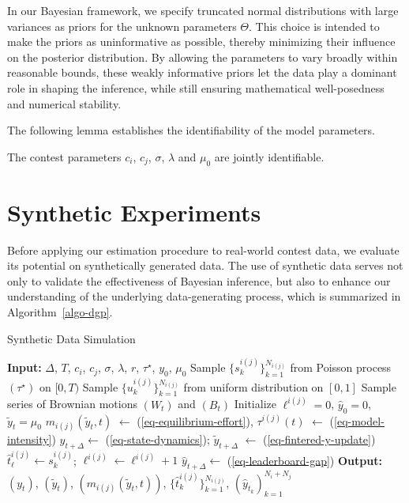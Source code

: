 \documentclass[mnsc]{informs3}
\begin{document}
In our Bayesian framework, we specify truncated normal distributions with large variances as priors for the unknown parameters $\Theta$.
This choice is intended to make the priors as uninformative as possible, thereby minimizing their influence on the posterior distribution. 
By allowing the parameters to vary broadly within reasonable bounds, these weakly informative priors let the data play a dominant role in shaping the inference, while still ensuring mathematical well-posedness and numerical stability.


The following lemma establishes the identifiability of the model parameters.

\begin{lemma}\label{lmm-params-identifiability}
The contest parameters $c_i$, $c_j$, $\sigma$, $\lambda$ and $\mu_0$ are jointly identifiable. 
\end{lemma}




\section{Synthetic Experiments}\label{sect-synthetic}

Before applying our estimation procedure to real-world contest data, we evaluate its potential on synthetically generated data. 
The use of synthetic data serves not only to validate the effectiveness of Bayesian inference, but also to enhance our understanding of the underlying data-generating process, which is summarized in Algorithm~\ref{algo-dgp}. 

\begin{algorithm}[!ht]
\caption{Synthetic Data Simulation}
\label{algo-dgp}
\begin{algorithmic}
\STATE \textbf{Input:} 
	$\Delta$, $T$, $c_i$, $c_j$, $\sigma$, $\lambda$, $r$, $\tau^\star$, $y_0$, $\mu_0$
\STATE Sample $\{s_k^{i(j)}\}^{N_{i(j)}}_{k=1}$ from Poisson process $(\tau^\star)$ on $[0, T)$
\STATE Sample $\{u_k^{i(j)}\}^{N_{i(j)}}_{k=1}$ from uniform distribution on $[0, 1]$
\STATE Sample series of Brownian motions $(W_t)$ and $(B_t)$
\STATE Initialize $\ell^{i(j)}=0$, $\hat{y}_0 = 0$, $\tilde{y}_t=\mu_0$
    \STATE $m_{i(j)}(\tilde{y}_t, t)$  $\gets$ (\ref{eq-equilibrium-effort}), $\tau^{i(j)}(t)$ $\gets$ (\ref{eq-model-intensity})
    \hfill {}
    \STATE $y_{t+\Delta} \gets$ (\ref{eq-state-dynamics}); $\tilde{y}_{t+\Delta}$ $\gets$ (\ref{eq-fintered-y-update})
    \hfill {}
    \FOR{$s_{k}^{i(j)} \in [t, t+\Delta)$} 
        	    \STATE $\hat{t}^{i(j)}_{\ell} \gets s_{k}^{i(j)}$; $\ell^{i(j)} \gets \ell^{i(j)}+1$
	    \hfill {}
	    \STATE $\hat{y}_{t+\Delta} \gets $ (\ref{eq-leaderboard-gap})
	    \hfill {}
        \ENDIF
    \ENDFOR
\ENDFOR
\STATE \textbf{Output:} $(y_t)$, $(\tilde{y}_t)$, $(m_{i(j)}(\tilde{y}_t, t))$, $\{\hat{t}_k^{i(j)}\}^{N_{i(j)}}_{k=1}$, $(\hat{y}_{t_k})_{k=1}^{N_i + N_j}$
\end{algorithmic}
\end{algorithm}
\end{document}
